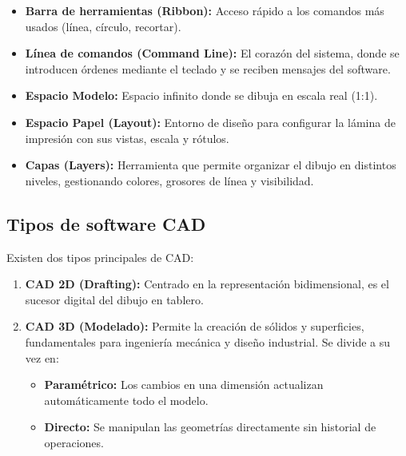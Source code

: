 \begin{itemize}
	\item \textbf{Barra de herramientas (Ribbon):} Acceso rápido a los
	      comandos más usados (línea, círculo, recortar).
	\item \textbf{Línea de comandos (Command Line):} El corazón del
	      sistema, donde se introducen órdenes mediante el teclado y se
	      reciben mensajes del software.
	\item \textbf{Espacio Modelo:} Espacio infinito donde se dibuja en
	      escala real (1:1).
	\item \textbf{Espacio Papel (Layout):} Entorno de diseño para
	      configurar la lámina de impresión con sus vistas, escala y
	      rótulos.
	\item \textbf{Capas (Layers):} Herramienta que permite organizar el
	      dibujo en distintos niveles, gestionando colores, grosores de
	      línea y visibilidad.
\end{itemize}

\subsection{Tipos de software CAD}

Existen dos tipos principales de CAD:

\begin{enumerate}
	\item \textbf{CAD 2D (Drafting):} Centrado en la representación
	      bidimensional, es el sucesor digital del dibujo en tablero.
	\item \textbf{CAD 3D (Modelado):} Permite la creación de sólidos y
	      superficies, fundamentales para ingeniería mecánica y diseño
	      industrial. Se divide a su vez en:
	      \begin{itemize}
		      \item \textbf{Paramétrico:} Los cambios en una dimensión
		            actualizan automáticamente todo el modelo.
		      \item \textbf{Directo:} Se manipulan las geometrías directamente
		            sin historial de operaciones.
	      \end{itemize}
\end{enumerate}

